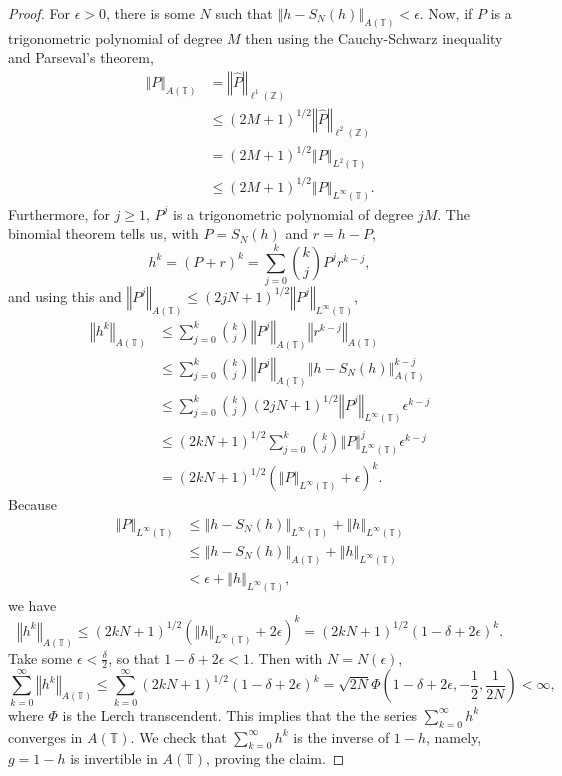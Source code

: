 \documentclass{article}
\newcommand{\norm}[1]{\left\Vert #1 \right\Vert}
\theoremstyle{definition}
\theoremstyle{definition}
\begin{document}
\begin{proof}
For $\epsilon>0$, there is some $N$ such that
$\norm{h-S_N(h)}_{A(\mathbb{T})}<\epsilon$. 
Now, if $P$ is a trigonometric polynomial of degree $M$ then using the Cauchy-Schwarz
inequality and Parseval's theorem, 
\begin{align*}
\norm{P}_{A(\mathbb{T})}&=\norm{\hat{P}}_{\ell^1(\mathbb{Z})}\\
&\leq (2M+1)^{1/2} \norm{\hat{P}}_{\ell^2(\mathbb{Z})}\\
&= (2M+1)^{1/2} \norm{P}_{L^2(\mathbb{T})}\\
&\leq (2M+1)^{1/2} \norm{P}_{L^\infty(\mathbb{T})}.
\end{align*}
Furthermore, for $j \geq 1$, $P^j$ is a trigonometric polynomial of degree $jM$. 
The binomial theorem tells us, with $P=S_N(h)$ and $r=h-P$,
\[
h^k=(P+r)^k = \sum_{j=0}^k \binom{k}{j} P^j r^{k-j},
\]
and using this and $\norm{P^j}_{A(\mathbb{T})} \leq
(2jN+1)^{1/2} \norm{P^j}_{L^\infty(\mathbb{T})}$,
\begin{align*}
\norm{h^k}_{A(\mathbb{T})}&\leq  \sum_{j=0}^k \binom{k}{j} \norm{P^j}_{A(\mathbb{T})}
\norm{r^{k-j}}_{A(\mathbb{T})}\\
&\leq  \sum_{j=0}^k \binom{k}{j} \norm{P^j}_{A(\mathbb{T})}
\norm{h-S_N(h)}_{A(\mathbb{T})}^{k-j}\\
&\leq  \sum_{j=0}^k \binom{k}{j} (2jN+1)^{1/2} \norm{P^j}_{L^\infty(\mathbb{T})} \epsilon^{k-j}\\
&\leq (2kN+1)^{1/2} \sum_{j=0}^k \binom{k}{j}  \norm{P}_{L^\infty(\mathbb{T})}^j \epsilon^{k-j}\\
&= (2kN+1)^{1/2} (\norm{P}_{L^\infty(\mathbb{T})}+\epsilon)^k.
\end{align*}
Because
\begin{align*}
\norm{P}_{L^\infty(\mathbb{T})} & \leq \norm{h-S_N(h)}_{L^\infty(\mathbb{T})}
+\norm{h}_{L^\infty(\mathbb{T})}\\
&\leq \norm{h-S_N(h)}_{A(\mathbb{T})}
+\norm{h}_{L^\infty(\mathbb{T})}\\
&<\epsilon+\norm{h}_{L^\infty(\mathbb{T})},
\end{align*}
we have
\[
\norm{h^k}_{A(\mathbb{T})} \leq  (2kN+1)^{1/2} (\norm{h}_{L^\infty(\mathbb{T})}+2\epsilon)^k
= (2kN+1)^{1/2} (1-\delta+2\epsilon)^k.
\]
Take some $\epsilon<\frac{\delta}{2}$, so that $1-\delta+2\epsilon<1$. Then with $N=N(\epsilon)$,
\[
\sum_{k=0}^\infty \norm{h^k}_{A(\mathbb{T})} \leq \sum_{k=0}^\infty
 (2kN+1)^{1/2} (1-\delta+2\epsilon)^k
 =\sqrt{2N} \Phi\left(1-\delta+2\epsilon,-\frac{1}{2},\frac{1}{2N}\right)<\infty,
  \]
  where $\Phi$ is the Lerch transcendent. This implies that the 
  the series $\sum_{k=0}^\infty h^k$ converges in $A(\mathbb{T})$. We check that
  $\sum_{k=0}^\infty h^k$ is the inverse of $1-h$, namely, $g=1-h$ is invertible in
  $A(\mathbb{T})$, proving the claim.
\end{proof}
\end{document}
